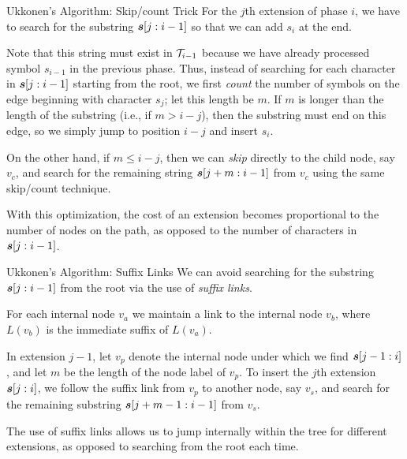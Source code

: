 \begin{frame}{Ukkonen's Algorithm: Skip/count Trick}
For the $j$th extension of phase $i$,
we have to search for the substring ${\boldsymbol s}[j:i-1]$
so that we can add
$s_i$ at the end. 

\medskip
Note that
this string must exist in ${\mathcal T}_{i-1}$ because we have already processed
symbol $s_{i-1}$ in the previous phase.
  Thus, instead of searching for each
  character in ${\boldsymbol s}[j:i-1]$ starting from the root, we f\/{i}rst
  {\em count} the number of symbols on
  the edge beginning with character
  $s_{j}$; let this length be $m$. If
  $m$ is longer than the length of the substring (i.e., if $m > i-j$), then
  the substring must end on this edge, so we simply jump to position
  $i-j$ and insert $s_i$.

  \medskip
  On the other hand, if $m \le i-j$, then we can
  {\em skip} directly to the child node,
  say $v_c$, and
  search for the remaining string ${\boldsymbol s}[j+m:i-1]$ from
  $v_c$ using the same skip/count technique.

  \medskip
  With this
  optimization, the cost of an extension becomes proportional
  to the number of nodes on the path, as opposed to the number of
  characters in ${\boldsymbol s}[j:i-1]$.
\end{frame}
  
  

\begin{frame}{Ukkonen's Algorithm: Suffix Links}
We can avoid searching for the substring ${\boldsymbol s}[j:i-1]$ 
from the root via the use of {\em suff\/{i}x links}.

\medskip
For each internal node $v_a$ we maintain a link to the
internal node $v_b$, where $L(v_b)$ is the immediate suff\/{i}x of $L(v_a)$.

\medskip
In extension $j-1$, let $v_p$ denote the internal node under which we
f\/{i}nd ${\boldsymbol s}[j-1:i]$, and let $m$ be the length of the node label of $v_p$.
To insert the $j$th extension ${\boldsymbol s}[j:i]$,
we follow the suff\/{i}x link from $v_p$ to another node, say $v_s$, and
search for the
remaining substring ${\boldsymbol s}[j+m-1:i-1]$ from $v_s$.

\medskip
The use of suff\/{i}x links allows us to jump internally within the tree for
different extensions, as opposed to searching from the root each time.
\end{frame}

